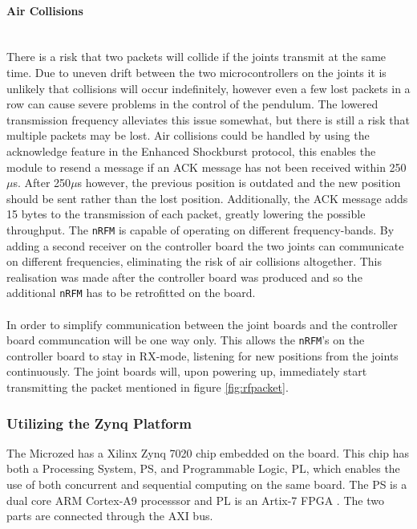 \paragraph{Air Collisions}~\\
\label{par:air_collisions}
There is a risk that two packets will collide if the joints transmit at the same time.
Due to uneven drift between the two microcontrollers on the joints it is unlikely that collisions will occur indefinitely, however even a few lost packets in a row can cause severe problems in the control of the pendulum.
The lowered transmission frequency alleviates this issue somewhat, but there is still a risk that multiple packets may be lost.
Air collisions could be handled by using the acknowledge feature in the Enhanced Shockburst protocol, this enables the module to resend a message if an ACK message has not been received within 250$\mu$s.
After 250$\mu$s however, the previous position is outdated and the new position should be sent rather than the lost position.
Additionally, the ACK message adds 15 bytes to the transmission of each packet, greatly lowering the possible throughput.
The \texttt{nRFM} is capable of operating on different frequency-bands.
By adding a second receiver on the controller board the two joints can communicate on different frequencies, eliminating the risk of air collisions altogether.
This realisation was made after the controller board was produced and so the additional \texttt{nRFM} has to be retrofitted on the board. 
\\~\\
In order to simplify communication between the joint boards and the controller board communcation will be one way only.
This allows the \texttt{nRFM}'s on the controller board to stay in RX-mode, listening for new positions from the joints continuously.
The joint boards will, upon powering up, immediately start transmitting the packet mentioned in figure \ref{fig:rfpacket}.

\subsubsection{Utilizing the Zynq Platform} %
\label{ssub:utializing_the_zynq_platform}
The Microzed has a Xilinx Zynq 7020 chip embedded on the board. 
This chip has both a Processing System, PS, and Programmable Logic, PL, which enables the use of both concurrent and sequential computing on the same board. 
The PS is a dual core ARM Cortex-A9 processsor and PL is an Artix-7 FPGA \cite{zynq_data_sheet}.
The two parts are connected through the AXI bus.

